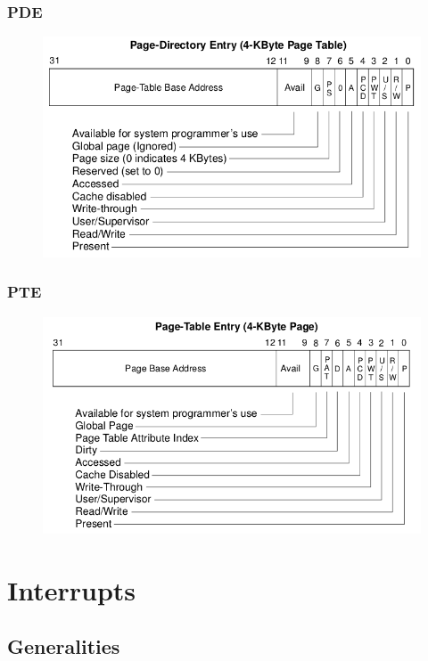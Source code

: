 \documentclass{beamer}
\begin{document}
\begin{frame}
  \frametitle{PDE}

  \begin{figure}
  \includegraphics[scale=0.4]{pde.png}
  \end{figure}
\end{frame}

\begin{frame}
  \frametitle{PTE}

  \begin{figure}
  \includegraphics[scale=0.4]{pte.png}
  \end{figure}
\end{frame}


\section{Interrupts}

\subsection{Generalities}
\end{document}
